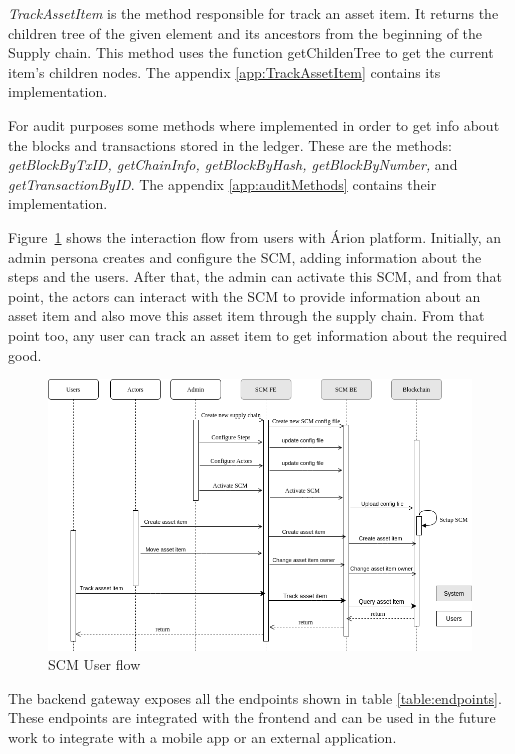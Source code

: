 \textit{TrackAssetItem} is the method responsible for track an asset item. It returns the children tree of the given element and its ancestors from the beginning of the Supply chain. This method uses the function getChildenTree to get the current item's children nodes. The appendix \ref{app:TrackAssetItem} contains its implementation.

For audit purposes some methods where implemented in order to get info about the blocks and transactions stored in the ledger. These are the methods: \textit{getBlockByTxID, getChainInfo, getBlockByHash, getBlockByNumber,} and \textit{getTransactionByID}. The appendix \ref{app:auditMethods} contains their implementation.

Figure~\ref{fig:sequenceDiagram} shows the interaction flow from users with Árion platform. Initially, an admin persona creates and configure the SCM, adding information about the steps and the users. After that, the admin can activate this SCM, and from that point, the actors can interact with the SCM to provide information about an asset item and also move this asset item through the supply chain. From that point too, any user can track an asset item to get information about the required good.

\begin{figure}[ht]
\begin{center}
  \includegraphics[scale=0.5]{images/SequenceDiagram.png}
\caption{SCM User flow}
\label{fig:sequenceDiagram}
\end{center}
\end{figure}


The backend gateway exposes all the endpoints shown in table \ref{table:endpoints}. These endpoints are integrated with the frontend and can be used in the future work to integrate with a mobile app or an external application.


